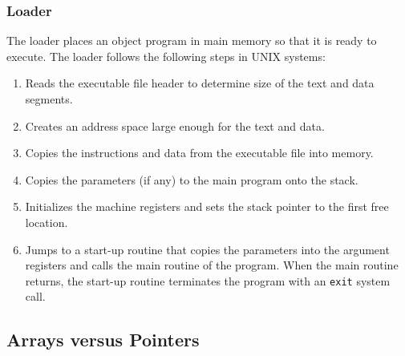 \documentclass[10pt]{article}
\begin{document}
\subsubsection{Loader}
The loader places an object program in main memory so that it is ready to execute.  The loader follows the following steps in UNIX systems:
\begin{enumerate}
\item Reads the executable file header to determine size of the text and data segments.
\item Creates an address space large enough for the text and data.
\item Copies the instructions and data from the executable file into memory.
\item Copies the parameters (if any) to the main program onto the stack.
\item Initializes the machine registers and sets the stack pointer to the first free location.
\item Jumps to a start-up routine that copies the parameters into the argument registers and calls the main routine of the program. When the main routine returns, the start-up routine terminates the program with an \texttt{exit} system call.
\end{enumerate}

\addtocounter{subsection}{1}
\subsection{Arrays versus Pointers}\label{subsec:}
\end{document}
